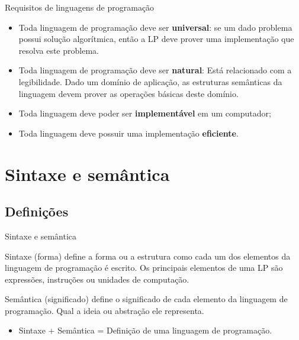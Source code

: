 \documentclass[handout, aspectratio=169]{beamer}
\newcommand{\bi}{\begin{itemize}[<+->]}
\newcommand{\ei}{\end{itemize}}
\begin{document}
\begin{frame}{Requisitos de linguagens de programação}

   \bi
        \item Toda linguagem de programação deve ser \textbf{universal}: se um dado problema possui solução algorítmica, então a LP deve prover uma implementação que resolva este problema.
        \item Toda linguagem de programação deve ser \textbf{natural}: Está relacionado com a legibilidade. Dado um domínio de aplicação, as estruturas semânticas da linguagem devem prover as operações básicas deste domínio.
        \item Toda linguagem deve poder ser \textbf{implementável} em um computador;
        \item Toda linguagem deve possuir uma implementação \textbf{eficiente}.

   \ei

\end{frame}



\section{Sintaxe e semântica}

\subsection{Definições}


\begin{frame}{Sintaxe e semântica}
	\begin{block}{Sintaxe (forma)}
		define a forma ou a estrutura como cada um dos elementos da linguagem de programação é escrito. Os principais elementos de uma LP são expressões, instruções ou unidades de computação.
	\end{block}

	\begin{block}{Semântica (significado)}
		define o significado de cada elemento da linguagem de programação. Qual a ideia ou abstração ele representa.
	\end{block}

	\begin{itemize}
		\item Sintaxe + Semântica = Definição de uma linguagem de programação.
	\end{itemize}
\end{frame}
\end{document}
